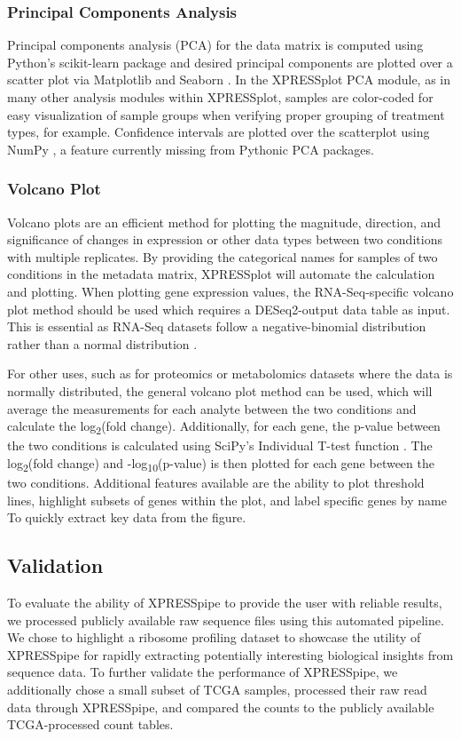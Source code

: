 \documentclass[10pt, oneside]{article}
\begin{document}
\subsubsection{Principal Components Analysis}
Principal components analysis (PCA) for the data matrix is computed using Python's scikit-learn package \cite{scikit_learn} and desired principal components are plotted over a scatter plot via Matplotlib \cite{matplotlib} and Seaborn \cite{seaborn}. In the XPRESSplot PCA module, as in many other analysis modules within XPRESSplot, samples are color-coded for easy visualization of sample groups when verifying proper grouping of treatment types, for example. Confidence intervals are plotted over the scatterplot using NumPy \cite{numpy1, numpy2}, a feature currently missing from Pythonic PCA packages.

\subsubsection{Volcano Plot}
Volcano plots are an efficient method for plotting the magnitude, direction, and significance of changes in expression or other data types between two conditions with multiple replicates. By providing the categorical names for samples of two conditions in the metadata matrix, XPRESSplot will automate the calculation and plotting. When plotting gene expression values, the RNA-Seq-specific volcano plot method should be used which requires a DESeq2-output data table as input. This is essential as RNA-Seq datasets follow a negative-binomial distribution rather than a normal distribution \cite{deseq2}. \par

For other uses, such as for proteomics or metabolomics datasets where the data is normally distributed, the general volcano plot method can be used, which will average the measurements for each analyte between the two conditions and calculate the log\textsubscript{2}(fold change). Additionally, for each gene, the p-value between the two conditions is calculated using SciPy's Individual T-test function \cite{scipy}. The log\textsubscript{2}(fold change) and -log\textsubscript{10}(p-value) is then plotted for each gene between the two conditions. Additional features available are the ability to plot threshold lines, highlight subsets of genes within the plot, and label specific genes by name To quickly extract key data from the figure.


\subsection{Validation}
To evaluate the ability of XPRESSpipe to provide the user with reliable results, we processed publicly available raw sequence files using this automated pipeline. We chose to highlight a ribosome profiling dataset to showcase the utility of XPRESSpipe for rapidly extracting potentially interesting biological insights from sequence data. To further validate the performance of XPRESSpipe, we additionally chose a small subset of TCGA samples, processed their raw read data through XPRESSpipe, and compared the counts to the publicly available TCGA-processed count tables.
\end{document}
